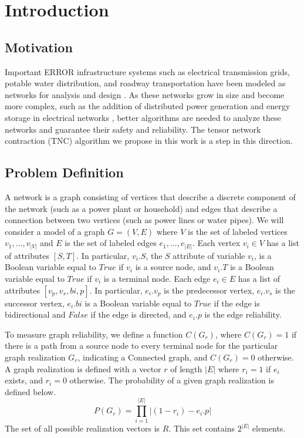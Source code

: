 \hypertarget{introduction}{%
\section{Introduction}\label{introduction}}

\hypertarget{motivation}{%
\subsection{Motivation}\label{motivation}}

Important ERROR infrastructure systems such as electrical transmission grids, potable water distribution, and roadway transportation have been modeled as networks for analysis and design \cite{levy1967monte} \cite{cotilla2012comparing}. As these networks grow in size and become more complex, such as the addition of distributed power generation and energy storage in electrical networks \cite{escalera2018survey}, better algorithms are needed to analyze these networks and guarantee their safety and reliability. The tensor network contraction (TNC) algorithm we propose in this work is a step in this direction.

\hypertarget{problem-definition}{%
\subsection{Problem Definition}\label{problem-definition}}

A network is a graph consisting of vertices that describe a discrete component of the network (such as a power plant or household) and edges that describe a connection between two vertices (such as power lines or water pipes). We will consider a model of a graph \(G = (V,E)\) where \(V\) is the set of labeled vertices \(v_1,...,v_{|V|}\) and \(E\) is the set of labeled edges \(e_1,...,e_{|E|}\). Each vertex \(v_i \in V\) has a list of attributes \([S,T]\). In particular, \(v_i.S\), the \(S\) attribute of variable \(v_i\), is a Boolean variable equal to \(True\) if \(v_i\) is a source node, and \(v_i.T\) is a Boolean variable equal to \(True\) if \(v_i\) is a terminal node. Each edge \(e_i \in E\) has a list of attributes \([v_p,v_s,bi,p]\). In particular, \(e_i.v_p\) is the predecessor vertex, \(e_i.v_s\) is the successor vertex, \(e_i.bi\) is a Boolean variable equal to \(True\) if the edge is bidirectional and \(False\) if the edge is directed, and \(e_i.p\) is the edge reliability.

To measure graph reliability, we define a function \(C(G_r)\), where \(C(G_r)=1\) if there is a path from a source node to every terminal node for the particular graph realization \(G_r\), indicating a Connected graph, and \(C(G_r)=0\) otherwise. A graph realization is defined with a vector \(r\) of length \(|E|\) where \(r_i=1\) if \(e_i\) exists, and \(r_i=0\) otherwise. The probability of a given graph realization is defined below. \[P(G_r) = \prod_{i=1}^{|E|} |(1-r_i)-e_i.p|\] The set of all possible realization vectors is \(R\). This set contains \(2^{|E|}\) elements.

